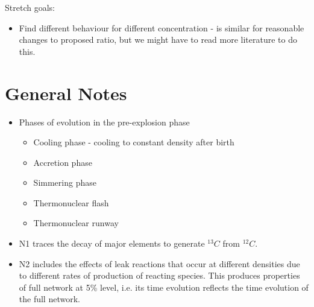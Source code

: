 \documentclass[11pt]{article}
\begin{document}
	Stretch goals:	
	\begin{itemize}
		\item Find different behaviour for different concentration - is similar for reasonable changes to proposed ratio, but we might have to read more literature to do this.
	\end{itemize}

\section{General Notes}
	\begin{itemize}
		\item Phases of evolution in the pre-explosion phase
			\begin{itemize}
				\item Cooling phase - cooling to constant density after birth
				\item Accretion phase
				\item Simmering phase
				\item Thermonuclear flash
				\item Thermonuclear runway
			\end{itemize}
		\item N1 traces the decay of major elements to generate $^{13}C$ from $^{12}C$.
		\item N2 includes the effects of leak reactions that occur at different densities due to different rates of production of reacting species. This produces properties of full network at 5\% level, i.e. its time evolution reflects the time evolution of the full network.
	\end{itemize}
\end{document}
